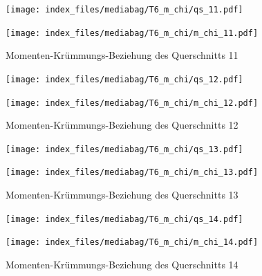 \documentclass[
  11pt,
  letterpaper,
]{scrreprt}
\begin{document}
\begin{figure}[H]

\begin{minipage}{0.50\linewidth}
\texttt{[image: index\_files/mediabag/T6\_m\_chi/qs\_11.pdf]}\end{minipage}%
%
\begin{minipage}{0.50\linewidth}
\texttt{[image: index\_files/mediabag/T6\_m\_chi/m\_chi\_11.pdf]}\end{minipage}%

\caption{\label{fig-mchi_anhang}Momenten-Krümmungs-Beziehung des
Querschnitts 11}

\end{figure}%

\begin{figure}[H]

\begin{minipage}{0.50\linewidth}
\texttt{[image: index\_files/mediabag/T6\_m\_chi/qs\_12.pdf]}\end{minipage}%
%
\begin{minipage}{0.50\linewidth}
\texttt{[image: index\_files/mediabag/T6\_m\_chi/m\_chi\_12.pdf]}\end{minipage}%

\caption{\label{fig-mchi_anhang}Momenten-Krümmungs-Beziehung des
Querschnitts 12}

\end{figure}%

\begin{figure}[H]

\begin{minipage}{0.50\linewidth}
\texttt{[image: index\_files/mediabag/T6\_m\_chi/qs\_13.pdf]}\end{minipage}%
%
\begin{minipage}{0.50\linewidth}
\texttt{[image: index\_files/mediabag/T6\_m\_chi/m\_chi\_13.pdf]}\end{minipage}%

\caption{\label{fig-mchi_anhang}Momenten-Krümmungs-Beziehung des
Querschnitts 13}

\end{figure}%

\begin{figure}[H]

\begin{minipage}{0.50\linewidth}
\texttt{[image: index\_files/mediabag/T6\_m\_chi/qs\_14.pdf]}\end{minipage}%
%
\begin{minipage}{0.50\linewidth}
\texttt{[image: index\_files/mediabag/T6\_m\_chi/m\_chi\_14.pdf]}\end{minipage}%

\caption{\label{fig-mchi_anhang}Momenten-Krümmungs-Beziehung des
Querschnitts 14}

\end{figure}%
\end{document}
